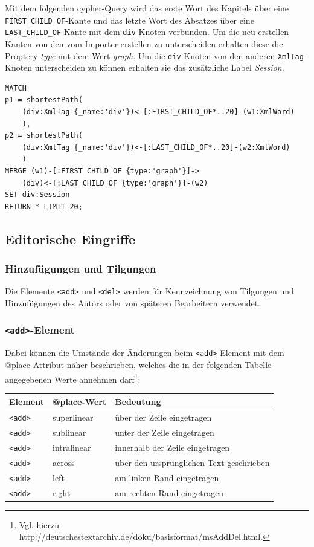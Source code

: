 \documentclass[12pt,ngerman,]{article}
\begin{document}
Mit dem folgenden cypher-Query wird das erste Wort des Kapitels über
eine \texttt{FIRST\_CHILD\_OF}-Kante und das letzte Wort des Absatzes
über eine \texttt{LAST\_CHILD\_OF}-Kante mit dem \texttt{div}-Knoten
verbunden. Um die neu erstellen Kanten von den vom Importer erstellen zu
unterscheiden erhalten diese die Proptery \emph{type} mit dem Wert
\emph{graph}. Um die \texttt{div}-Knoten von den anderen
\texttt{XmlTag}-Knoten unterscheiden zu können erhalten sie das
zusätzliche Label \emph{Session}.

\begin{verbatim}
MATCH
p1 = shortestPath(
    (div:XmlTag {_name:'div'})<-[:FIRST_CHILD_OF*..20]-(w1:XmlWord)
    ),
p2 = shortestPath(
    (div:XmlTag {_name:'div'})<-[:LAST_CHILD_OF*..20]-(w2:XmlWord)
    )
MERGE (w1)-[:FIRST_CHILD_OF {type:'graph'}]->
    (div)<-[:LAST_CHILD_OF {type:'graph'}]-(w2)
SET div:Session
RETURN * LIMIT 20;
\end{verbatim}

\subsection{Editorische Eingriffe}\label{editorische-eingriffe}

\subsubsection{Hinzufügungen und
Tilgungen}\label{hinzufuxfcgungen-und-tilgungen}

Die Elemente \texttt{\textless{}add\textgreater{}} und
\texttt{\textless{}del\textgreater{}} werden für Kennzeichnung von
Tilgungen und Hinzufügungen des Autors oder von späteren Bearbeitern
verwendet.

\subsubsection{\texorpdfstring{\texttt{\textless{}add\textgreater{}}-Element}{\textless{}add\textgreater{}-Element}}\label{add-element}

Dabei können die Umstände der Änderungen beim
\texttt{\textless{}add\textgreater{}}-Element mit dem @place-Attribut
näher beschrieben, welches die in der folgenden Tabelle angegebenen
Werte annehmen darf\footnote{Vgl. hierzu
  http://deutschestextarchiv.de/doku/basisformat/msAddDel.html.}:

\begin{longtable}[]{@{}lll@{}}
\toprule
Element & @place-Wert & Bedeutung\tabularnewline
\midrule
\endhead
\texttt{\textless{}add\textgreater{}} & superlinear & über der Zeile
eingetragen\tabularnewline
\texttt{\textless{}add\textgreater{}} & sublinear & unter der Zeile
eingetragen\tabularnewline
\texttt{\textless{}add\textgreater{}} & intralinear & innerhalb der
Zeile eingetragen\tabularnewline
\texttt{\textless{}add\textgreater{}} & across & über den ursprünglichen
Text geschrieben\tabularnewline
\texttt{\textless{}add\textgreater{}} & left & am linken Rand
eingetragen\tabularnewline
\texttt{\textless{}add\textgreater{}} & right & am rechten Rand
eingetragen\tabularnewline
\bottomrule
\end{longtable}
\end{document}
